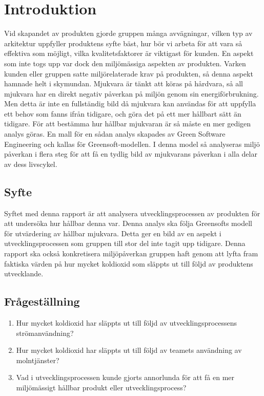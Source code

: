 \section{Introduktion}
\label{sec:joel_a-introduction}
Vid skapandet av produkten gjorde gruppen många avvägningar, vilken typ av arkitektur uppfyller produktens syfte bäst, hur bör vi arbeta för att vara så effektiva som möjligt, vilka kvalitetsfaktorer är viktigast för kunden. En aspekt som inte togs upp var dock den miljömässiga aspekten av produkten. Varken kunden eller gruppen satte miljörelaterade krav på produkten, så denna aspekt hamnade helt i skymundan. Mjukvara är tänkt att köras på hårdvara, så all mjukvara har en direkt negativ påverkan på miljön genom sin energiförbrukning. Men detta är inte en fullständig bild då mjukvara kan användas för att uppfylla ett behov som fanns ifrån tidigare, och göra det på ett mer hållbart sätt än tidigare. För att bestämma hur hållbar mjukvaran är så måste en mer gedigen analys göras. En mall för en sådan analys skapades av Green Software Engineering och kallas för Greensoft-modellen\cite{greensoft}. I denna model så analyseras miljö påverkan i flera steg för att få en tydlig bild av mjukvarans påverkan i alla delar av dess livscykel.

\subsection{Syfte}
Syftet med denna rapport är att analysera utvecklingsprocessen av produkten för att undersöka hur hållbar denna var. Denna analys ska följa Greensofts modell för utvärdering av hållbar mjukvara. Detta ger en bild av en aspekt i utvecklingsprocessen som gruppen till stor del inte tagit upp tidigare. Denna rapport ska också konkretisera miljöpåverkan gruppen haft genom att lyfta fram faktiska värden på hur mycket koldioxid som släppts ut till följd av produktens utvecklande.

\subsection{Frågeställning}
\label{subsec:joel_a-research-questions}

\begin{enumerate}

\item Hur mycket koldioxid har släppts ut till följd av utvecklingsprocessens strömanvändning?

\item Hur mycket koldioxid har släppts ut till följd av teamets användning av molntjänster?

\item Vad i utvecklingsprocessen kunde gjorts annorlunda för att få en mer miljömässigt hållbar produkt eller utvecklingsprocess?

\end{enumerate}

